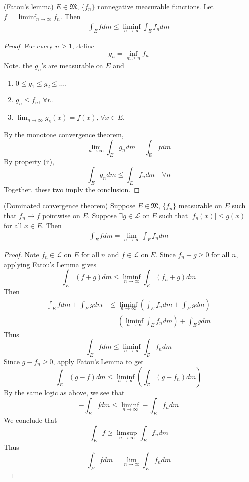 \documentclass[11pt]{article}
\begin{document}
\begin{lemma} (Fatou's lemma) $E \in \mathfrak{M}$, $\{ f_n \}$ nonnegative measurable functions. Let $f = \liminf_{n \to \infty} f_n$. Then \begin{align*} \int_E f dm \le \liminf_{n \to \infty} \int_E f_n dm \end{align*}
\end{lemma}
\begin{proof} For every $n \ge 1$, define $$g_n = \inf_{m \ge n} f_n$$ Note. the $g_n$'s are measurable on $E$ and \begin{enumerate}
  \item $0 \le g_1 \le g_2 \le \dots$.
  \item $g_n \le f_n$, $\forall n$.
  \item  $\lim_{n \to \infty} g_n(x) = f(x)$, $\forall x \in E$.
  \end{enumerate}
  By the monotone convergence theorem, $$\lim_{n \to \infty} \int_E g_n dm = \int_E f dm$$ By property (ii), $$\int_E g_n dm \le \int_E f_n dm \quad \forall n$$ Together, these two imply the conclusion.
\end{proof}

\begin{theorem} (Dominated convergence theorem) Suppose $E \in \mathfrak{M}$, $\{ f_n \}$ measurable on $E$ such that $f_n \to f$ pointwise on $E$. Suppose $\exists g \in \mathscr{L}$ on $E$ such that $|f_n(x)| \le g(x)$ for all $x \in E$. Then \begin{align*} \int_E f dm = \lim_{n \to \infty} \int_E f_n dm \end{align*}
\end{theorem}
\begin{proof}
  Note $f_n \in \mathscr{L}$ on $E$ for all $n$ and $f \in \mathscr{L}$ on $E$. Since $f_n + g \ge 0$ for all $n$, applying Fatou's Lemma gives $$\int_E (f + g) dm \le \liminf_{n \to \infty} \int_E (f_n + g) dm$$ Then \begin{align*} \int_E f dm + \int_E g dm & \le \liminf_{n \to \infty} \left( \int_E f_n dm + \int_E g dm \right) \\ & = \left( \liminf_{n \to \infty} \int_E f_n dm \right) + \int_E g dm \end{align*} Thus $$\int_E f dm \le \liminf_{n \to \infty} \int_E f_n dm$$ Since $g - f_n \ge 0$, apply Fatou's Lemma to get $$\int_E (g - f) dm \le \liminf_{n \to \infty} \left( \int_E (g - f_n) dm \right)$$ By the same logic as above, we see that $$- \int_E f dm \le \liminf_{n \to \infty} - \int_E f_n dm$$ We conclude that $$\int_E f \ge \limsup_{n \to \infty} \int_E f_n dm$$ Thus $$\int_E f dm = \lim_{n \to \infty} \int_E f_n dm$$
\end{proof}
\end{document}
